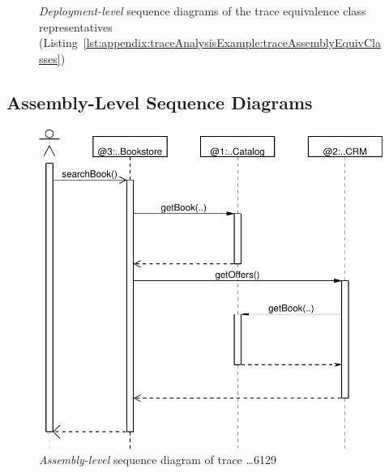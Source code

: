 \begin{figure}[h]
{}
\caption{\textit{Deployment-level} sequence diagrams of the trace %
equivalence class representatives (Listing~\ref{lst:appendix:traceAnalysisExample:traceAssemblyEquivClasses})}
\end{figure}

\newpage

\subsection{Assembly-Level Sequence Diagrams}

\begin{figure}[h]\centering
\includegraphics[scale=0.4]{images/example-plots/assemblySequenceDiagram-6488138950668976129-crop}
\caption{\textit{Assembly-level} sequence diagram of trace \ldots{}6129}
\end{figure}

